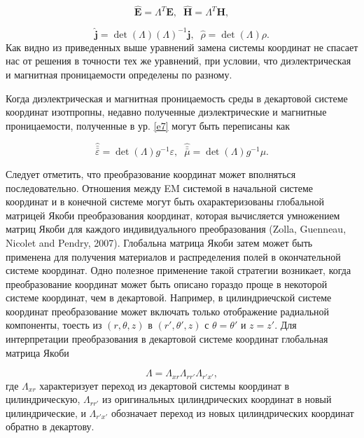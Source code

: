 \documentclass[12pt,a4paper]{article}
\begin{document}
\begin{equation}\label{e8}
	\mathbf{\hat{E}} = \Lambda^T\mathbf{E}, \;\; 
	\mathbf{\hat{H}} = \Lambda^T\mathbf{H},
\end{equation}

\begin{equation}\label{e9}
\mathbf{\hat{j}} = \det(\Lambda)(\Lambda)^{-1}\mathbf{j}, \;\;
\hat{\rho} = \det(\Lambda)\rho.	
\end{equation}
Как видно из приведенных выше уравнений замена системы координат не спасает нас от решения в точности 
тех же уравнений, при условии, что диэлектрическая и магнитная проницаемости определены по разному.

Когда диэлектрическая и магнитная проницаемость среды в декартовой системе координат изотпропны,
недавно полученные диэлектрические и магнитные проницаемости, полученные в ур. \ref{e7} могут
быть переписаны как

\begin{equation}
	\hat{\bar{\bar{\varepsilon}}} = \det(\Lambda)g^{-1} \varepsilon,\;\;
	\hat{\bar{\bar{\mu}}} = \det(\Lambda)g^{-1} \mu.	
\end{equation}

Следует отметить, что преобразование координат может вполняться последовательно. Отношения между EM 
системой в начальной системе координат и в конечной системе могут быть охарактеризованы глобальной 
матрицей Якоби преобразования координат, которая вычисляется умножением матриц Якоби для каждого
индивидуального преобразования (Zolla, Guenneau, Nicolet and Pendry, 2007). Глобальна матрица Якоби
затем может быть применена для получения материалов и распределения полей в окончательной системе
координат. Одно полезное применение такой стратегии возникает, когда преобразование координат может
быть описано гораздо проще в некоторой системе координат, чем в декартовой. Например, в цилиндриечской
системе координат преобразование может включать только отображение радиальной компоненты, тоесть
из $(r, \theta, z)$ в $(r', \theta', z)$ с $\theta=\theta'$ и $z=z'$. Для интерпретации преобразования
в декартовой системе координат глобальная матрица Якоби 

\begin{equation}
	\Lambda = \Lambda_{xr}\Lambda_{rr'}\Lambda_{r'x'},
\end{equation}
где $\Lambda_{xr}$ характеризует переход из декартовой системы координат в цилиндрическую, $\Lambda_{rr'}$
из оригинальных цилиндрических координат в новый цилиндрические, и $\Lambda_{r'x'}$ обозначает переход
из новых цилиндрических координат обратно в декартову.
\end{document}
